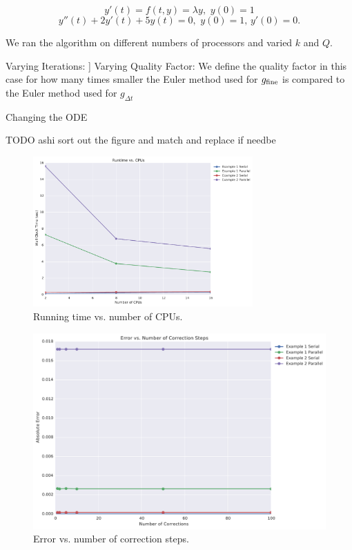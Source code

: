 \documentclass[letterpaper,12pt]{article}
\begin{document}
\[
y'(t) = f(t, y) = \lambda y, \, \, y(0) = 1
\]
\[
y''(t) + 2y'(t) + 5y(t) = 0, \, \, y(0) = 1, \, y'(0) = 0.
\]

We ran the algorithm on different numbers of processors and varied $k$ and $Q$. 

Varying Iterations:
]
Varying Quality Factor:
We define the quality factor in this case for how many times smaller the Euler method used for $g_{\textnormal{fine}}$ is compared to the Euler method used for $g_{\Delta t}$

Changing the ODE

TODO ashi sort out the figure and match and replace if needbe

\begin{figure}
\begin{center}
\includegraphics[width=0.75\textwidth]{data/runtime_vs_cpus.pdf}
\caption{Running time vs. number of CPUs.}
\label{fig:run_v_cpu}
\end{center}
\end{figure}

\begin{figure}
\begin{center}
\includegraphics[width=0.75\linewidth]{data/error_vs_corrections.pdf}
\caption{Error vs. number of correction steps.}
\label{fig:err_v_k}
\end{center}
\end{figure}
\end{document}
